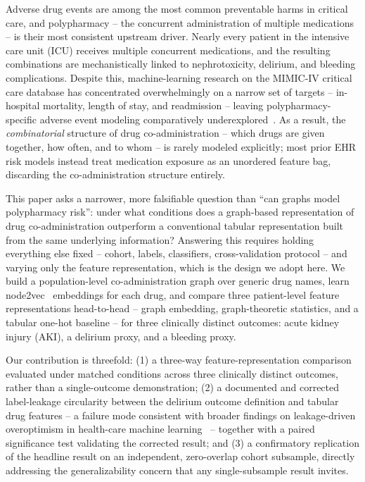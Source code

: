 \documentclass[conference]{IEEEtran}
\begin{document}
Adverse drug events are among the most common preventable harms in
critical care, and polypharmacy -- the concurrent administration of
multiple medications -- is their most consistent upstream driver. Nearly
every patient in the intensive care unit (ICU) receives multiple concurrent
medications, and the resulting combinations are mechanistically linked to
nephrotoxicity, delirium, and bleeding complications. Despite this,
machine-learning research on the MIMIC-IV critical care database has
concentrated overwhelmingly on a narrow set of targets -- in-hospital
mortality, length of stay, and readmission -- leaving polypharmacy-specific
adverse event modeling comparatively
underexplored~\cite{harutyunyan2019benchmarking,rohr2024revisiting}. As a
result, the \emph{combinatorial} structure of drug co-administration --
which drugs are given together, how often, and to whom -- is rarely modeled
explicitly; most prior EHR risk models instead treat medication exposure as
an unordered feature bag, discarding the co-administration structure
entirely.

This paper asks a narrower, more falsifiable question than ``can graphs
model polypharmacy risk'': under what conditions does a graph-based
representation of drug co-administration outperform a conventional tabular
representation built from the same underlying information? Answering this
requires holding everything else fixed -- cohort, labels, classifiers,
cross-validation protocol -- and varying only the feature representation,
which is the design we adopt here. We build a population-level
co-administration graph over generic drug names, learn
node2vec~\cite{grover2016node2vec} embeddings for each drug, and compare
three patient-level feature representations head-to-head -- graph
embedding, graph-theoretic statistics, and a tabular one-hot baseline -- for
three clinically distinct outcomes: acute kidney injury (AKI), a delirium
proxy, and a bleeding proxy.

Our contribution is threefold: (1) a three-way feature-representation
comparison evaluated under matched conditions across three clinically
distinct outcomes, rather than a single-outcome demonstration; (2) a
documented and corrected label-leakage circularity between the delirium
outcome definition and tabular drug features -- a failure mode consistent
with broader findings on leakage-driven overoptimism in health-care machine
learning~\cite{davis2023labelleakage,kapoor2023leakage} -- together with a
paired significance test validating the corrected result; and (3) a
confirmatory replication of the headline result on an independent,
zero-overlap cohort subsample, directly addressing the generalizability
concern that any single-subsample result invites.
\end{document}
